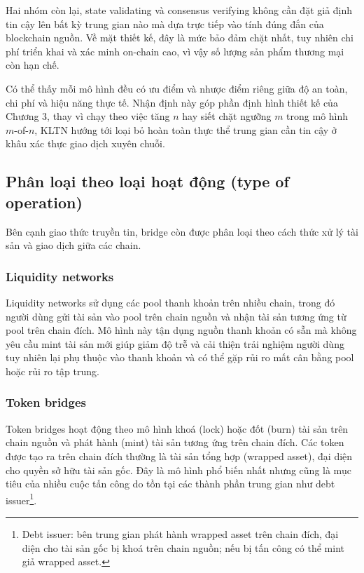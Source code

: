 Hai nhóm còn lại, state validating và consensus verifying không cần đặt
giả định tin cậy lên bất kỳ trung gian nào mà dựa trực tiếp vào tính đúng đắn của
blockchain nguồn. Về mặt thiết kế, đây là mức bảo đảm chặt nhất, tuy nhiên chi phí
triển khai và xác minh on-chain cao, vì vậy số lượng sản phẩm thương mại còn hạn chế.

Có thể thấy mỗi mô hình đều có ưu điểm và nhược điểm riêng giữa độ an toàn, chi phí
và hiệu năng thực tế. Nhận định này góp phần định hình thiết kế của Chương 3,
thay vì chạy theo việc tăng $n$ hay siết chặt ngưỡng $m$ trong mô hình $m$-of-$n$,
KLTN hướng tới loại bỏ hoàn toàn thực thể trung gian cần tin cậy ở khâu xác thực
giao dịch xuyên chuỗi.

\subsection{Phân loại theo loại hoạt động (type of operation)}

Bên cạnh giao thức truyền tin, bridge còn được phân loại theo cách thức xử lý tài sản
và giao dịch giữa các chain.

\subsubsection*{Liquidity networks}

Liquidity networks sử dụng các pool thanh khoản trên nhiều chain, 
trong đó người dùng gửi tài sản vào pool trên chain nguồn và nhận tài sản tương ứng 
từ pool trên chain đích. 
Mô hình này tận dụng nguồn thanh khoản có sẵn mà không yêu cầu mint tài sản mới
giúp giảm độ trễ và cải thiện trải nghiệm người dùng tuy nhiên lại phụ thuộc vào thanh khoản
và có thể gặp rủi ro mất cân bằng pool hoặc rủi ro tập trung.

\subsubsection*{Token bridges}

Token bridges hoạt động theo mô hình khoá (lock) hoặc đốt (burn) 
tài sản trên chain nguồn và phát hành (mint) tài sản tương ứng trên chain đích. 
Các token được tạo ra trên chain đích thường là tài sản tổng hợp (wrapped asset), 
đại diện cho quyền sở hữu tài sản gốc. 
Đây là mô hình phổ biến nhất nhưng cũng là mục tiêu của nhiều cuộc 
tấn công do tồn tại các thành phần trung gian như debt issuer\footnote{Debt issuer: bên trung gian phát hành wrapped asset trên chain đích, đại diện cho tài sản gốc bị khoá trên chain nguồn; nếu bị tấn công có thể mint giả wrapped asset.}.

